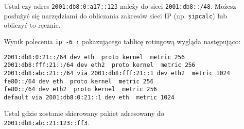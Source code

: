 % 
% 
% 
% 


\dbEntryCheckResults
Ustal czy adres \Verb$2001:db8:0:a17::123$ należy do sieci \Verb$2001:db8::/48$. Możesz posłużyć się narzędziami do obliczania zakresów sieci IP (np. \Verb#sipcalc#) lub obliczyć to ręcznie.
\fi

\dbEntryCheckResults
Wynik polecenia \Verb#ip -6 r# pokazującego tablicę rotingową wygląda następująco:
\begin{Verbatim}
2001:db8:0:21::/64 dev eth  proto kernel  metric 256 
2001:db8:fff:21::/64 dev eth2  proto kernel  metric 256 
2001:db8:abc:21::/64 via 2001:db8:fff:21::1 dev eth2  metric 1024 
fe80::/64 dev eth  proto kernel  metric 256 
fe80::/64 dev eth2  proto kernel  metric 256 
default via 2001:db8:0:21::1 dev eth  metric 1024 
\end{Verbatim}

Ustal gdzie zostanie skierowany pakiet adresowany do \Verb$2001:db8:abc:21:123::ff3$.
\fi

